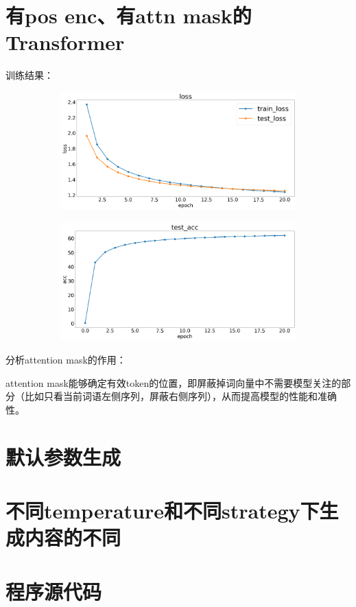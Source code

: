 \documentclass[11pt, a4paper]{article}
\begin{document}
\section{有pos enc、有attn mask的Transformer}
训练结果：
\begin{figure}[H]
    \hfill
    \begin{subfigure}[t]{0.45\linewidth}
        \includegraphics[width=\textwidth]{img/5-1.png}
    \end{subfigure}
    \hfill
    \begin{subfigure}[t]{0.45\linewidth}
        \includegraphics[width=\textwidth]{img/5-2.png}
    \end{subfigure}
    \hfill
\end{figure}


分析attention mask的作用：

attention mask能够确定有效token的位置，即屏蔽掉词向量中不需要模型关注的部分（比如只看当前词语左侧序列，屏蔽右侧序列），从而提高模型的性能和准确性。

\section{默认参数生成}

\section{不同temperature和不同strategy下生成内容的不同}

\section*{程序源代码}
\end{document}
